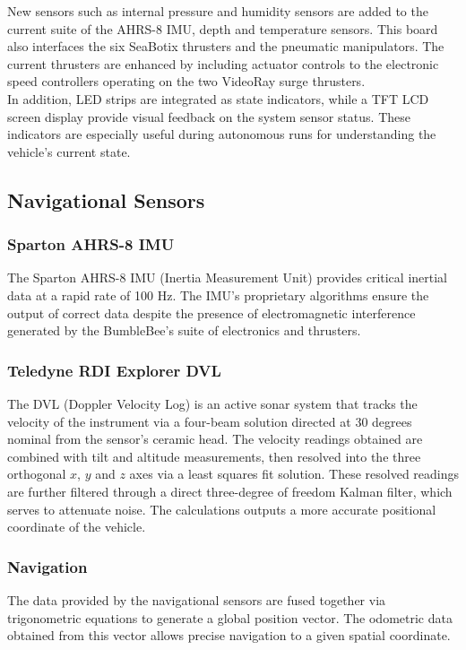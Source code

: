 \documentclass[journal,12pt]{IEEEtran}
\begin{document}
New sensors such as internal pressure and humidity sensors are added to the current suite of the AHRS-8 IMU, depth and temperature sensors. This board also interfaces the six SeaBotix thrusters and the pneumatic manipulators. The current thrusters are enhanced by including actuator controls to the electronic speed controllers operating on the two VideoRay surge thrusters. \\

In addition, LED strips are integrated as state indicators, while a TFT LCD screen display provide visual feedback on the system sensor status. These indicators are especially useful during autonomous runs for understanding the vehicle's current state.

\subsection{Navigational Sensors}
\subsubsection{Sparton AHRS-8 IMU}
The Sparton AHRS-8 IMU (Inertia Measurement Unit) provides critical inertial data at a rapid rate of 100 Hz. The IMU's proprietary algorithms ensure the output of correct data despite the presence of electromagnetic interference generated by the BumbleBee's suite of electronics and
thrusters. \\

\subsubsection{Teledyne RDI Explorer DVL}
The DVL (Doppler Velocity Log) is an active sonar system that tracks the velocity of
the instrument via a four-beam solution directed at 30 degrees nominal from the
sensor's ceramic head. The velocity readings obtained are combined with tilt and altitude measurements, then resolved into the three orthogonal $x$, $y$ and $z$ axes via a least squares fit solution. These resolved readings are further filtered through a direct three-degree of freedom Kalman filter, which serves to attenuate noise. The calculations outputs a more accurate positional coordinate of the vehicle. \\ 

\subsubsection{Navigation}
The data provided by the navigational sensors are fused together via
trigonometric equations to generate a global position vector. The odometric data obtained from this vector allows precise navigation to a given spatial coordinate.
\end{document}
